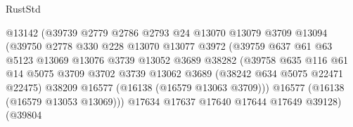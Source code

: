 \begin{lexlean}{RustStd}
\begin{coremodule}
                                      @13142
                                      (@39739
                                        @2779
                                        @2786
                                        @2793
                                        @24
                                        @13070
                                        @13079
                                        @3709
                                        @13094
                                        (@39750
                                          @2778
                                          @330
                                          @228
                                          @13070
                                          @13077
                                          @3972
                                          (@39759
                                            @637
                                            @61
                                            @63
                                            @5123
                                            @13069
                                            @13076
                                            @3739
                                            @13052
                                            @3689
                                            @38282
                                            (@39758
                                              @635
                                              @116
                                              @61
                                              @14
                                              @5075
                                              @3709
                                              @3702
                                              @3739
                                              @13062
                                              @3689
                                              (@38242 @634 @5075 @22471 @22475)
                                              @38209
                                              @16577
                                              (@16138 (@16579 @13063 @3709)))
                                            @16577
                                            (@16138 (@16579 @13053 @13069)))
                                          @17634
                                          @17637
                                          @17640
                                          @17644
                                          @17649
                                          @39128)
                                        (@39804

\end{coremodule}
\end{lexlean}
